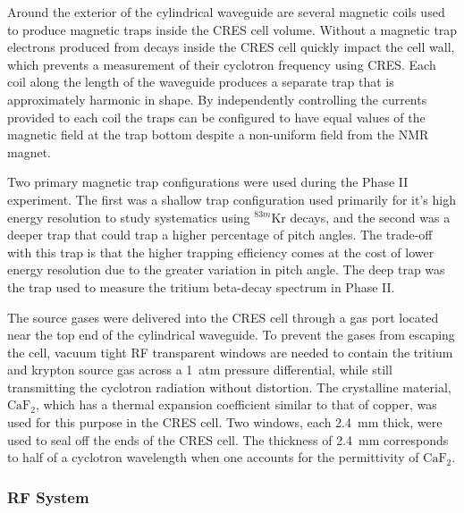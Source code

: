 Around the exterior of the cylindrical waveguide are several magnetic coils used to produce magnetic traps inside the CRES cell volume. Without a magnetic trap electrons produced from decays inside the CRES cell quickly impact the cell wall, which prevents a measurement of their cyclotron frequency using CRES. Each coil along the length of the waveguide produces a separate trap that is approximately harmonic in shape. By independently controlling the currents provided to each coil the traps can be configured to have equal values of the magnetic field at the trap bottom despite a non-uniform field from the NMR magnet. 

Two primary magnetic trap configurations were used during the Phase II experiment. The first was a shallow trap configuration used primarily for it's high energy resolution to study systematics using $^{83m}$Kr decays, and the second was a deeper trap that could trap a higher percentage of pitch angles. The trade-off with this trap is that the higher trapping efficiency comes at the cost of lower energy resolution due to the greater variation in pitch angle. The deep trap was the trap used to measure the tritium beta-decay spectrum in Phase II.

The source gases were delivered into the CRES cell through a gas port located near the top end of the cylindrical waveguide. To prevent the gases from escaping the cell, vacuum tight RF transparent windows are needed to contain the tritium and krypton source gas across a 1~atm pressure differential, while still transmitting the cyclotron radiation without distortion. The crystalline material, $\mathrm{CaF}_2$, which has a thermal expansion coefficient similar to that of copper, was used for this purpose in the CRES cell. Two windows, each 2.4~mm thick, were used to seal off the ends of the CRES cell. The thickness of 2.4~mm corresponds to half of a cyclotron wavelength when one accounts for the permittivity of $\mathrm{CaF}_2$.

\subsubsection*{RF System}


